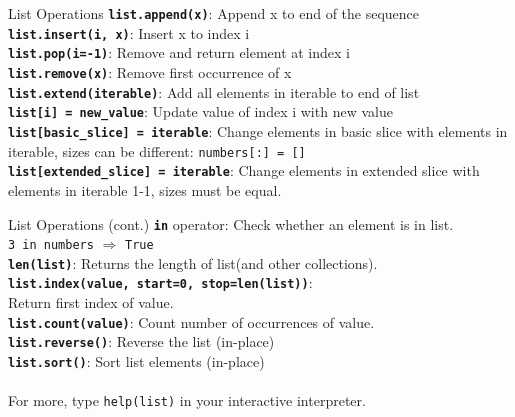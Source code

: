         \begin{frame}{List Operations}
            \Large
            \textbf{\texttt{list.append(x)}}: Append x to end of the sequence\\
            \textbf{\texttt{list.insert(i, x)}}: Insert x to index i\\
            \textbf{\texttt{list.pop(i=-1)}}: Remove and return element at index i\\
            \textbf{\texttt{list.remove(x)}}: Remove first occurrence of x\\
            \textbf{\texttt{list.extend(iterable)}}: Add all elements in iterable to end of list\\
            \textbf{\texttt{list[i] = new\_value}}: Update value of index i with new value\\
            \textbf{\texttt{list[basic\_slice] = iterable}}: Change elements in basic slice with elements in iterable, sizes can be different: \texttt{numbers[:] = []}\\
            \textbf{\texttt{list[extended\_slice] = iterable}}: Change elements in extended slice with elements in iterable 1-1, sizes must be equal.\\
        \end{frame}

        \begin{frame}{List Operations (cont.)}
            \Large
            \textbf{\texttt{in}} operator: Check whether an element is in list.\\
            \texttt{3 in numbers} $\Rightarrow$ \texttt{True}\\
            \textbf{\texttt{len(list)}}: Returns the length of list(and other collections).\\
            \textbf{\texttt{list.index(value, start=0, stop=len(list))}}:\\
            Return first index of value.\\
            \textbf{\texttt{list.count(value)}}: Count number of occurrences of value.\\
            \textbf{\texttt{list.reverse()}}: Reverse the list (in-place)\\
            \textbf{\texttt{list.sort()}}: Sort list elements (in-place)\\
            \\ 
            For more, type \texttt{help(list)} in your interactive interpreter.
        \end{frame}

